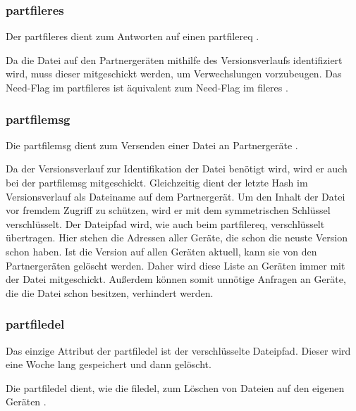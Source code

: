 \subsubsection{\gls{partfileres}}
\sblitpartfileresbytefield
Der \gls{partfileres} dient zum Antworten auf einen \gls{partfilereq} .

\begin{description}
	Da die Datei auf den Partnergeräten mithilfe des Versionsverlaufs identifiziert wird, muss dieser mitgeschickt werden, um Verwechslungen vorzubeugen.
	Das Need-Flag im \gls{partfileres} ist äquivalent zum Need-Flag im \gls{fileres} .
\end{description}

\subsubsection{\gls{partfilemsg}}
\sblitpartfilemsgbytefield
Die \gls{partfilemsg} dient zum Versenden einer Datei an Partnergeräte  .
\begin{description}
	Da der Versionsverlauf zur Identifikation der Datei benötigt wird, wird er auch bei der \gls{partfilemsg} mitgeschickt. Gleichzeitig dient der letzte Hash im Versionsverlauf als Dateiname auf dem Partnergerät.
	Um den Inhalt der Datei vor fremdem Zugriff zu schützen, wird er mit dem symmetrischen Schlüssel  verschlüsselt. 
	Der Dateipfad wird, wie auch beim \gls{partfilereq}, verschlüsselt übertragen. 
	Hier stehen die Adressen aller Geräte, die schon die neuste Version schon haben. Ist die Version auf allen Geräten aktuell, kann sie von den Partnergeräten gelöscht werden. Daher wird diese Liste an Geräten immer mit der Datei mitgeschickt. Außerdem können somit unnötige Anfragen an Geräte, die die Datei schon besitzen, verhindert werden.
\end{description}

\subsubsection{\gls{partfiledel}}
\sblitpartfiledelbytefield
\begin{description}
	Das einzige Attribut der \gls{partfiledel} ist der verschlüsselte Dateipfad. Dieser wird eine Woche lang gespeichert und dann gelöscht.
\end{description}
Die \gls{partfiledel} dient, wie die \gls{filedel}, zum Löschen von Dateien auf den eigenen Geräten .

